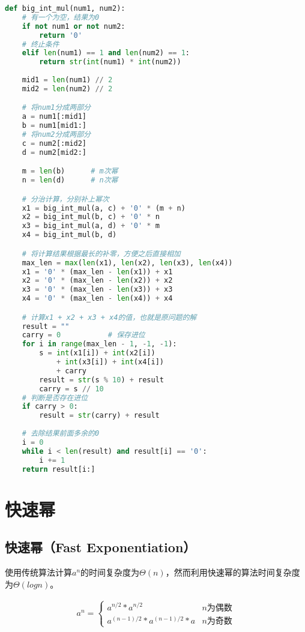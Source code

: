 \begin{lstlisting}[language=Python]
def big_int_mul(num1, num2):
    # 有一个为空，结果为0
    if not num1 or not num2:
        return '0'
    # 终止条件
    elif len(num1) == 1 and len(num2) == 1:
        return str(int(num1) * int(num2))
    
    mid1 = len(num1) // 2
    mid2 = len(num2) // 2

    # 将num1分成两部分
    a = num1[:mid1]
    b = num1[mid1:]
    # 将num2分成两部分
    c = num2[:mid2]
    d = num2[mid2:]

    m = len(b)      # m次幂
    n = len(d)      # n次幂

    # 分治计算，分别补上幂次
    x1 = big_int_mul(a, c) + '0' * (m + n)
    x2 = big_int_mul(b, c) + '0' * n
    x3 = big_int_mul(a, d) + '0' * m
    x4 = big_int_mul(b, d)

    # 将计算结果根据最长的补零，方便之后直接相加
    max_len = max(len(x1), len(x2), len(x3), len(x4))
    x1 = '0' * (max_len - len(x1)) + x1
    x2 = '0' * (max_len - len(x2)) + x2
    x3 = '0' * (max_len - len(x3)) + x3
    x4 = '0' * (max_len - len(x4)) + x4

    # 计算x1 + x2 + x3 + x4的值，也就是原问题的解
    result = ""
    carry = 0           # 保存进位
    for i in range(max_len - 1, -1, -1):
        s = int(x1[i]) + int(x2[i]) 
            + int(x3[i]) + int(x4[i])
            + carry
        result = str(s % 10) + result
        carry = s // 10
    # 判断是否存在进位
    if carry > 0:
        result = str(carry) + result
    
    # 去除结果前面多余的0
    i = 0
    while i < len(result) and result[i] == '0':
        i += 1
    return result[i:]
\end{lstlisting}

\newpage

\section{快速幂}

\subsection{快速幂（Fast Exponentiation）}

使用传统算法计算$ a^n $的时间复杂度为$ \Theta(n) $，然而利用快速幂的算法时间复杂度为$ \Theta(logn) $。

\vspace{-0.5cm}

\begin{align*}
	a^n = \begin{cases}
		a^{n/2} * a^{n/2}             & n\text{为偶数} \\
		a^{(n-1)/2} * a^{(n-1)/2} * a & n\text{为奇数}
	\end{cases}
\end{align*}

